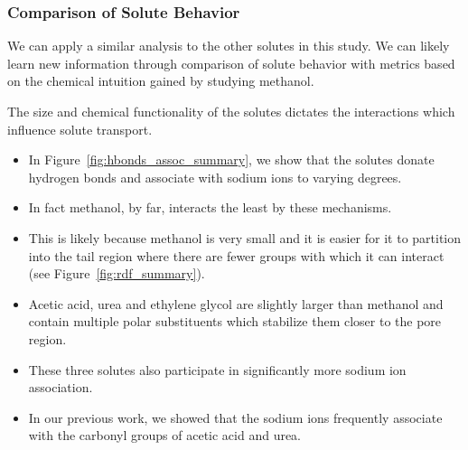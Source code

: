 \documentclass[journal=jpcbfk,manuscript=article]{achemso}
\begin{document}
  \subsubsection*{Comparison of Solute Behavior}
  
  We can apply a similar analysis to the other solutes in this study. We can likely
  learn new information through comparison of solute behavior with metrics based on
  the chemical intuition gained by studying methanol.
  
  The size and chemical functionality of the solutes dictates the interactions which
  influence solute transport.
  \begin{itemize}
    \item In Figure~\ref{fig:hbonds_assoc_summary}, we show that the solutes donate
    hydrogen bonds and associate with sodium ions to varying degrees.
    \item In fact methanol, by far, interacts the least by these mechanisms.
    \item This is likely because methanol is very small and it is easier for it to partition
    into the tail region where there are fewer groups with which it can interact (see
    Figure~\ref{fig:rdf_summary}).
    \item Acetic acid, urea and ethylene glycol are slightly larger than methanol
    and contain multiple polar substituents which stabilize them closer to the 
    pore region.
    \item These three solutes also participate in significantly more sodium ion
    association. 
    \item In our previous work, we showed that the sodium ions frequently associate
    with the carbonyl groups of acetic acid and urea.
  \end{itemize}
  
\end{document}
